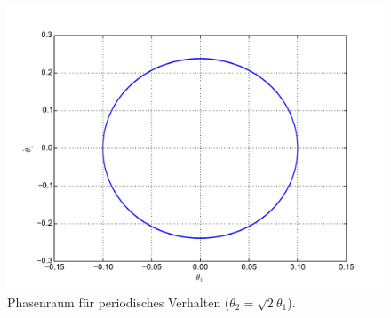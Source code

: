 \begin{figure}[H]
	\includegraphics[width = \textwidth]{../Plots/Plot_2_A_3_Phasenraum.pdf}
	\caption{Phasenraum für periodisches Verhalten ($\theta_2=\sqrt{2}\theta_1$).\label{fig:phasenraum3}}
\end{figure}

\newpage\newpage
